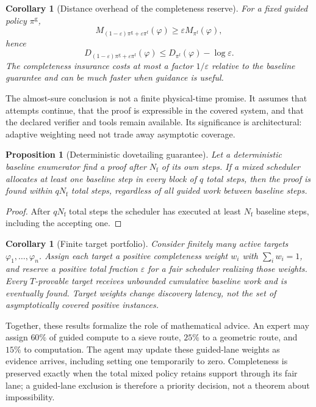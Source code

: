 \documentclass[11pt]{article}
\newtheorem{proposition}[definition]{Proposition}
\newtheorem{corollary}[definition]{Corollary}
\begin{document}
\begin{corollary}[Distance overhead of the completeness reserve]\label{cor:reserve-distance}
For a fixed guided policy $\pi^{\mathrm g}$,
\[
  M_{(1-\varepsilon)\pi^{\mathrm g}+\varepsilon\pi^{\mathrm f}}(\varphi)
  \geq \varepsilon M_{\pi^{\mathrm f}}(\varphi),
\]
hence
\[
  D_{(1-\varepsilon)\pi^{\mathrm g}+\varepsilon\pi^{\mathrm f}}(\varphi)
  \leq D_{\pi^{\mathrm f}}(\varphi)-\log\varepsilon.
\]
The completeness insurance costs at most a factor $1/\varepsilon$ relative to
the baseline guarantee and can be much faster when guidance is useful.
\end{corollary}

The almost-sure conclusion is not a finite physical-time promise.  It assumes
that attempts continue, that the proof is expressible in the covered system,
and that the declared verifier and tools remain available.  Its significance
is architectural: adaptive weighting need not trade away asymptotic coverage.

\begin{proposition}[Deterministic dovetailing guarantee]
\label{prop:dovetail}
Let a deterministic baseline enumerator find a proof after $N_{\mathrm f}$ of
its own steps.  If a mixed scheduler allocates at least one baseline step in
every block of $q$ total steps, then the proof is found within
$qN_{\mathrm f}$ total steps, regardless of all guided work between baseline
steps.
\end{proposition}

\begin{proof}
After $qN_{\mathrm f}$ total steps the scheduler has executed at least
$N_{\mathrm f}$ baseline steps, including the accepting one.
\end{proof}

\begin{corollary}[Finite target portfolio]\label{cor:finite-portfolio}
Consider finitely many active targets $\varphi_1,\ldots,\varphi_n$.  Assign each
target a positive completeness weight $w_i$ with $\sum_iw_i=1$, and reserve a
positive total fraction $\varepsilon$ for a fair scheduler realizing those
weights.  Every $T$-provable target receives unbounded cumulative baseline work
and is eventually found.  Target weights change discovery latency, not the set
of asymptotically covered positive instances.
\end{corollary}

Together, these results formalize the role of mathematical advice.  An expert may
assign $60\%$ of guided compute to a sieve route, $25\%$ to a geometric route,
and $15\%$ to computation.  The agent may update these guided-lane weights as
evidence arrives, including setting one temporarily to zero.  Completeness is
preserved exactly when the total mixed policy retains support through its fair
lane; a guided-lane exclusion is therefore a priority decision, not a theorem
about impossibility.
\end{document}
